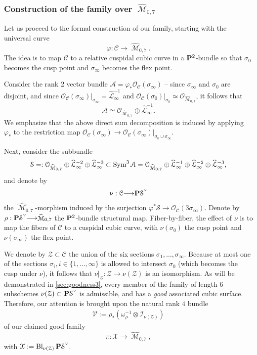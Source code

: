 \documentclass[12pt,reqno]{amsart}
\DeclareMathOperator{\Bl}{Bl}
\DeclareMathOperator{\M}{\mathcal{M}}
\renewcommand{\to}{{\longrightarrow}}
\numberwithin{equation}{section}
\renewcommand{\O}{\mathcal O}
\newcommand{\V}{\mathcal V}
\newcommand{\cC}{\mathcal{C}}
\newcommand{\cX}{\mathcal{X}}
\newcommand{\hL}{\widehat{\mathcal{L}}}
\newcommand{\smvee}{\raise0.5ex\hbox{$\scriptscriptstyle\vee$}}
\newcommand{\hM}{\widehat{\M}}
\begin{document}
\subsubsection{Construction of the family over $\hM_{0,7}$}
\label{sec:constr-family-hM07}

Let us proceed to the formal construction of our family, starting with
the universal curve
$$\varphi: \cC \to \hM_{0,7}.$$
The idea is to map $\cC$ to a relative cuspidal cubic curve in a
$\P^{2}$-bundle so that $\sigma_{0}$ becomes the cusp point and
$\sigma_{\infty}$ becomes the flex point.


Consider the rank $2$
vector bundle $\mathcal{A} = \varphi_{*}\O_{\cC}(\sigma_{\infty})$ --
since $\sigma_{\infty}$ and $\sigma_{0}$ are disjoint, and since
$\O_{\cC}(\sigma_{\infty})|_{\sigma_{\infty}} = \hL_{\infty}^{-1}$ and
$\O_{\cC}(\sigma_{0})|_{\sigma_{0}} \simeq \O_{\hM_{0,7}}$, it follows
that
$$\mathcal{A} \simeq \O_{\hM_{0,7}} \oplus \hL_{\infty}^{-1}.$$
We emphasize that the above direct sum decomposition is induced by
applying $\varphi_{*}$ to the restriction map
$\O_{\cC}(\sigma_{\infty}) \to \O_{\cC}(\sigma_{\infty})|_{\sigma_{0}
  \cup \sigma_{\infty}}.$

  Next, consider the subbundle
  \begin{align}
    \label{eq:S}
    \mathcal{S} = :\O_{\hM_{0,7}} \oplus \hL_{\infty}^{-2} \oplus \hL_{\infty}^{-3} \subset \Sym^{3} \mathcal{A} = \O_{\hM_{0,7}} \oplus \hL_{\infty}^{-1} \oplus \hL_{\infty}^{-2} \oplus \hL_{\infty}^{-3},
  \end{align}
  and denote by
  \begin{align}
    \label{eq:nu}
    \nu: \cC \to \P \mathcal{S}^{\smvee}
  \end{align}
  the $\hM_{0,7}$-morphism induced by the surjection
  $\varphi^{*}\mathcal{S} \to \O_{\cC}(3\sigma_{\infty})$. Denote by
  $\rho: \P \mathcal{S}^{\smvee} \to \hM_{0,7}$ the $\P^{2}$-bundle
  structural map.  Fiber-by-fiber, the effect of $\nu$ is to map the
  fibers of $\cC$ to a cuspidal cubic curve, with $\nu(\sigma_{0})$
  the cusp point and $\nu(\sigma_{\infty})$ the flex point.

  We denote by $\mathcal{Z} \subset \cC$ the union of the six sections
  $\sigma_{1}, \dots, \sigma_{\infty}$.  Because at most one of the
  sections $\sigma_{i}, i \in \{1, \dots, \infty\}$ is allowed to
  intersect $\sigma_{0}$ (which becomes the cusp under $\nu$), it
  follows that $\nu|_{\mathcal{Z}}:\mathcal{Z} \to \nu(\mathcal{Z})$
  is an isomorphism. As will be demonstrated in
  \autoref{sec:goodness3}, every member of the family of length $6$
  subschemes $\nu(\mathcal{Z}) \subset \P \mathcal{S}^{\smvee}$ is
  admissible, and has a {\sl good} associated cubic surface.
  Therefore, our attention is brought upon the natural rank $4$ bundle
  \begin{align}
    \label{eq:V3}
    \V := \rho_{*}\left(\omega_{\rho}^{-1} \otimes \mathcal{I}_{\nu(\mathcal{Z})}\right)
  \end{align}
  of our claimed good family $$\pi: \cX \to \hM_{0,7},$$ with
  $\cX := \Bl_{\nu(\mathcal{Z})}\P \mathcal{S}^{\smvee}$.
\end{document}
